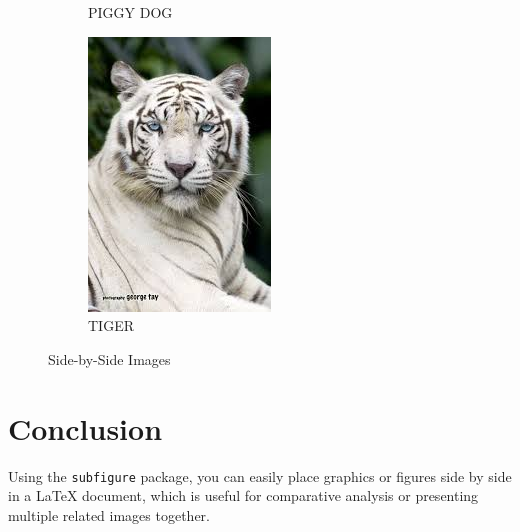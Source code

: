 \documentclass{article}
\begin{document}
\begin{figure}[h!]
\begin{subfigure}{0.45\textwidth}
        \caption{PIGGY DOG}
        \label{fig:first}
    \end{subfigure}
    \hfill
    \begin{subfigure}{0.45\textwidth}
        \centering
        \includegraphics[width=\linewidth]{tiger.jpeg}
        \caption{TIGER}
        \label{fig:second}
    \end{subfigure}
    \caption{Side-by-Side Images}
    \label{fig:side_by_side}
\end{figure}

\section{Conclusion}
Using the \texttt{subfigure} package, you can easily place graphics or figures side by side in a LaTeX document, which is useful for comparative analysis or presenting multiple related images together.
\end{document}
